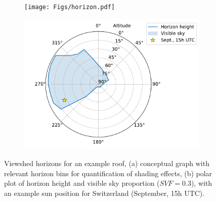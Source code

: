 \begin{figure}[htb]
	\centering
	\begin{subfigure}[t]{.49\textwidth}
		\centering
		\texttt{[image: Figs/horizon.pdf]}  
		\subcaption{}
	\end{subfigure}
	\begin{subfigure}[t]{.49\textwidth}
		\centering
		\includegraphics[width=\linewidth]{images/Figs/skyview_point_w_star.pdf}  
		\subcaption{}
		\label{figb:horizon_method}
	\end{subfigure}
	\caption{Viewshed horizons for an example roof, (a) conceptual graph with relevant horizon bins for quantification of shading effects, (b) polar plot of horizon height and visible sky proportion ($\mathit{SVF} = 0.3$), with an example sun position for Switzerland (September, 15h UTC).}
	\label{fig:horizon_method}
\end{figure}

